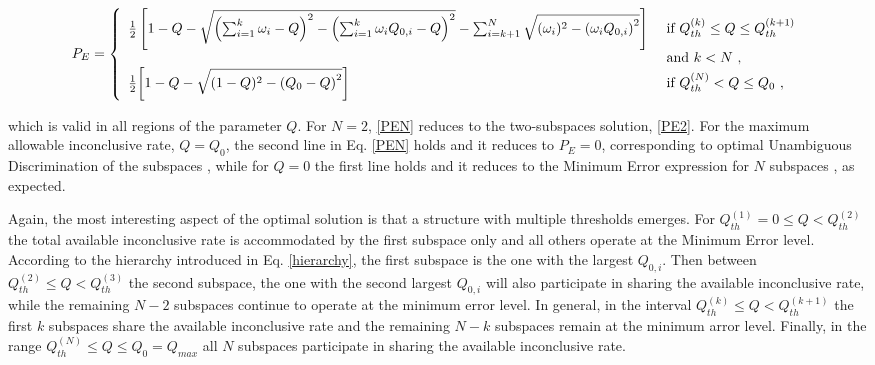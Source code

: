 \documentclass[aps,pra,twocolumn,eqsecnum,showpacs]{revtex4}
\begin{document}
\begin{widetext}
\begin{eqnarray}
    \label{PEN}
    P_{E} = \left\{ \begin{array}{ll}
    \frac{1}{2}\left[1- Q - \sqrt{\left(\sum_{i=1}^{k}\omega_{i} - Q\right)^2 - \left(\sum_{i=1}^{k}\omega_{i}Q_{0,i} - Q\right)^2} - \sum_{i=k+1}^{N}\sqrt{(\omega_{i} )^2 - \left(\omega_{i}Q_{0,i} \right)^2}\right] & \mbox{ if $Q_{th}^{(k)} \leq Q \leq  Q_{th}^{(k+1)}$} \\
{} & \mbox{ and $k < N$} \ , \\
    \frac{1}{2}\!\left[1 - Q - \sqrt{(1-Q)^2 - \left(Q_{0} - Q\right)^2}\right] & \mbox{ if $ Q_{th}^{(N)} < Q \leq
     Q_{0} $}  \ ,
    \end{array}
    \right. 
\nonumber \\
\end{eqnarray}

\end{widetext}
which is valid in all regions of the parameter $Q$. For $N=2$, \eqref{PEN} reduces to the two-subspaces solution, \eqref{PE2}. For the maximum allowable inconclusive rate, $Q=Q_{0}$, the second line in Eq. \eqref{PEN} holds and it reduces to $P_{E}=0$, corresponding to optimal Unambiguous Discrimination of the subspaces \cite{HB,BFH}, while for $Q=0$ the first line holds and it reduces to the Minimum Error expression for $N$ subspaces \cite{BBFHH}, as expected. 




Again, the most interesting aspect of the optimal solution is that a structure with multiple thresholds emerges. For $Q_{th}^{(1)}=0 \leq Q < Q_{th}^{(2)}$ the total available inconclusive rate is accommodated by the first subspace only and all others operate at the Minimum Error level. According to the hierarchy introduced in Eq. \eqref{hierarchy}, the first subspace is the one with the largest $Q_{0,i}$. Then between $Q_{th}^{(2)} \leq Q < Q_{th}^{(3)}$ the second subspace, the one with the second largest $Q_{0,i}$ will also participate in sharing the available inconclusive rate, while the remaining $N-2$ subspaces continue to operate at the minimum error level.  In general, in the interval $Q_{th}^{(k)} \leq Q < Q_{th}^{(k+1)}$ the first $k$ subspaces share the available inconclusive rate and the remaining $N-k$ subspaces remain at the minimum arror level.  Finally, in the range $Q_{th}^{(N)} \leq Q \leq Q_{0}=Q_{max}$ all $N$ subspaces participate in sharing the available inconclusive rate. 
\end{document}
